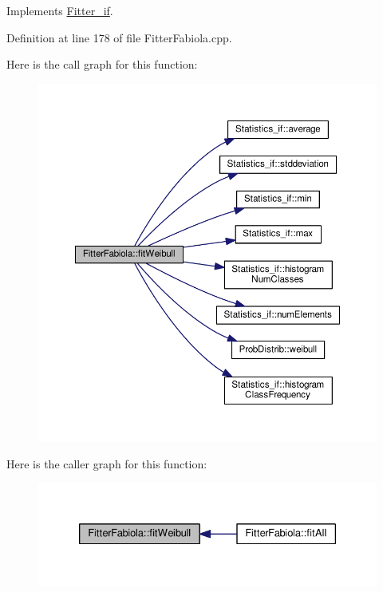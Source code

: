 Implements \hyperlink{class_fitter__if_a40c5bc2e953e683751743cf06df077c6}{Fitter\-\_\-if}.



Definition at line 178 of file Fitter\-Fabiola.\-cpp.



Here is the call graph for this function\-:
\nopagebreak
\begin{figure}[H]
\begin{center}
\leavevmode
\includegraphics[width=350pt]{class_fitter_fabiola_a7c80eaca6773e0b8d5ca6689b14188ec_cgraph}
\end{center}
\end{figure}




Here is the caller graph for this function\-:
\nopagebreak
\begin{figure}[H]
\begin{center}
\leavevmode
\includegraphics[width=330pt]{class_fitter_fabiola_a7c80eaca6773e0b8d5ca6689b14188ec_icgraph}
\end{center}
\end{figure}


